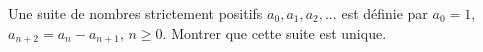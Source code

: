 Une suite de nombres strictement positifs $a_0, a_1, a_2, \ldots$ est définie par $a_0 = 1$, $a_{n+2} = a_n - a_{n+1}$, $n \geq 0$. Montrer que cette suite est unique.
